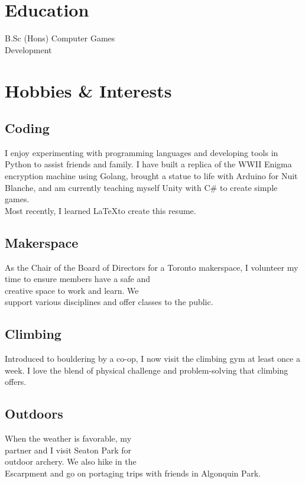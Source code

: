 \documentclass[
	10pt, %
]{FreemanCV}
\begin{document}
\begin{paracol}{2}

\section{Education} 
B.Sc (Hons) Computer Games \\Development
\medskip


\section{Hobbies \& Interests}
\subsection{Coding}
I enjoy experimenting with programming languages and developing tools in Python to assist friends and family. I have built a replica of the WWII Enigma encryption machine using Golang, brought a statue to life with Arduino for Nuit Blanche, and am currently teaching myself Unity with C\# to create simple games.\\Most recently, I learned \LaTeX to create this resume.

\subsection{Makerspace}
As the Chair of the Board of Directors for a Toronto makerspace, I volunteer my time to ensure members have a safe and \\creative space to work and learn. We \\support various disciplines and offer classes to the public.

\subsection{Climbing}
Introduced to bouldering by a co-op, I now visit the climbing gym at least once a week. I love the blend of physical challenge and problem-solving that climbing offers.

\subsection{Outdoors}
When the weather is favorable, my \\partner and I visit Seaton Park for \\outdoor archery. We also hike in the \\Escarpment and go on portaging trips with friends in Algonquin Park.


\end{paracol}
\end{document}
